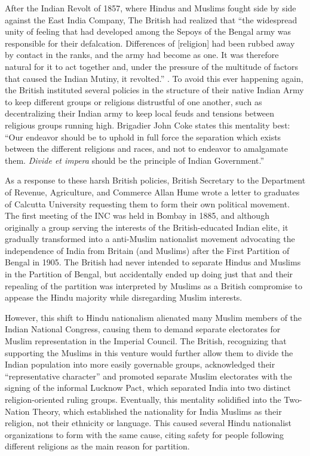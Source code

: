 \documentclass[11pt, letterpaper]{article}
\begin{document}
After the Indian Revolt of 1857, where Hindus and Muslims fought side by
side against the East India Company, The British had realized that ``the
widespread unity of feeling that had developed among the Sepoys of the
Bengal army was responsible for their defalcation. Differences of
{[}religion{]} had been rubbed away by contact in the ranks, and the
army had become as one. It was therefore natural for it to act together
and, under the pressure of the multitude of factors that caused the
Indian Mutiny, it revolted.'' \cite{mason} . To avoid this ever happening
again, the British instituted several policies in the structure of their
native Indian Army to keep different groups or religions distrustful of
one another, such as decentralizing their Indian army to keep local
feuds and tensions between religious groups running high. Brigadier John
Coke states this mentality best: ``Our endeavor should be to uphold in
full force the separation which exists between the different religions
and races, and not to endeavor to amalgamate them. \emph{Divide et
impera} should be the principle of Indian Government.'' \cite{guilford}

As a response to these harsh British policies, British Secretary to the
Department of Revenue, Agriculture, and Commerce Allan Hume wrote a
letter to graduates of Calcutta University requesting them to form their
own political movement. The first meeting of the INC was held in Bombay
in 1885, and although originally a group serving the interests of the
British-educated Indian elite, it gradually transformed into a
anti-Muslim nationalist movement advocating the independence of India
from Britain (and Muslims) after the First Partition of Bengal in 1905.
The British had never intended to separate Hindus and Muslims in the
Partition of Bengal, but accidentally ended up doing just that and their
repealing of the partition was interpreted by Muslims as a British
compromise to appease the Hindu majority while disregarding Muslim
interests.

However, this shift to Hindu nationalism alienated many Muslim members
of the Indian National Congress, causing them to demand separate
electorates for Muslim representation in the Imperial Council. The
British, recognizing that supporting the Muslims in this venture would
further allow them to divide the Indian population into more easily
governable groups, acknowledged their ``representative character'' and
promoted separate Muslim electorates with the signing of the informal
Lucknow Pact, which separated India into two distinct religion-oriented
ruling groups. Eventually, this mentality solidified into the Two-Nation
Theory, which established the nationality for India Muslims as their
religion, not their ethnicity or language. This caused several Hindu
nationalist organizations to form with the same cause, citing safety for
people following different religions as the main reason for partition.
\end{document}
